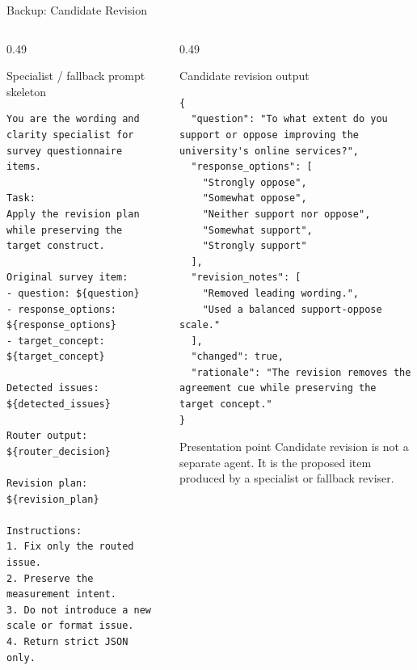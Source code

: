 \documentclass[aspectratio=169]{beamer}
\begin{document}
\begin{frame}[fragile]{Backup: Candidate Revision}
  \begin{columns}[T]
    \begin{column}{0.49\textwidth}
      \begin{block}{Specialist / fallback prompt skeleton}
\begin{lstlisting}
You are the wording and clarity specialist for survey questionnaire items.

Task:
Apply the revision plan while preserving the target construct.

Original survey item:
- question: ${question}
- response_options: ${response_options}
- target_concept: ${target_concept}

Detected issues:
${detected_issues}

Router output:
${router_decision}

Revision plan:
${revision_plan}

Instructions:
1. Fix only the routed issue.
2. Preserve the measurement intent.
3. Do not introduce a new scale or format issue.
4. Return strict JSON only.
\end{lstlisting}
      \end{block}
    \end{column}
    \begin{column}{0.49\textwidth}
      \begin{block}{Candidate revision output}
\begin{lstlisting}
{
  "question": "To what extent do you support or oppose improving the university's online services?",
  "response_options": [
    "Strongly oppose",
    "Somewhat oppose",
    "Neither support nor oppose",
    "Somewhat support",
    "Strongly support"
  ],
  "revision_notes": [
    "Removed leading wording.",
    "Used a balanced support-oppose scale."
  ],
  "changed": true,
  "rationale": "The revision removes the agreement cue while preserving the target concept."
}
\end{lstlisting}
      \end{block}

      \begin{alertblock}{Presentation point}
        Candidate revision is not a separate agent. It is the proposed item produced by a specialist or fallback reviser.
      \end{alertblock}
    \end{column}
  \end{columns}
\end{frame}
\end{document}
